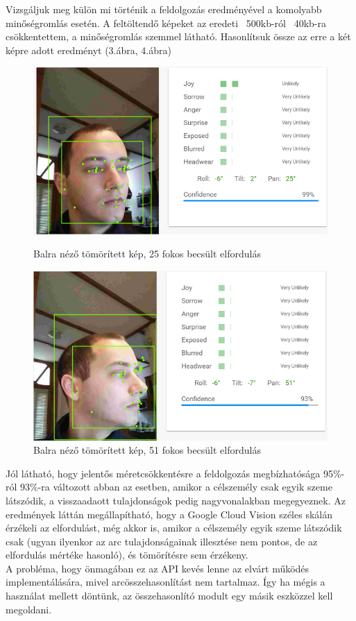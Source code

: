 Vizsgáljuk meg külön mi történik a feldolgozás eredményével a komolyabb minőségromlás esetén. A feltöltendő képeket az eredeti ~500kb-ról ~40kb-ra csökkentettem, a minőségromlás szemmel látható. Hasonlítsuk össze az erre a két képre adott eredményt (3.ábra, 4.ábra)
\begin{figure}[h]
 \begin{minipage}{.5\textwidth} 
\centering
    \includegraphics[scale=0.3]{img/cloud_vision_left_compressed}
    \caption{Balra néző tömörített kép, 25 fokos becsült elfordulás}
 \end{minipage}
 \begin{minipage}{.5\textwidth} 
\centering
     \includegraphics[scale=0.3]{img/cloud_vision_very_left_compressed}
     \caption{Balra néző tömörített kép, 51 fokos becsült elfordulás}
 \end{minipage}
\end{figure}

Jól látható, hogy jelentős méretcsökkentésre a feldolgozás megbízhatósága 95\%-ról 93\%-ra változott abban az esetben, amikor a célszemély csak egyik szeme látszódik, a visszaadaott tulajdonságok pedig nagyvonalakban megegyeznek. 
Az eredmények láttán megállapítható, hogy a Google Cloud Vision széles skálán érzékeli az elfordulást, még akkor is, amikor a célszemély egyik szeme látszódik csak (ugyan ilyenkor az arc tulajdonságainak illesztése nem pontos, de az elfordulás mértéke hasonló), és tömörítésre sem érzékeny.
\\A probléma, hogy önmagában ez az API kevés lenne az elvárt működés implementálására, mivel arcösszehasonlítást nem tartalmaz. Így ha mégis a használat mellett döntünk, az összehasonlító modult egy másik eszközzel kell megoldani.


